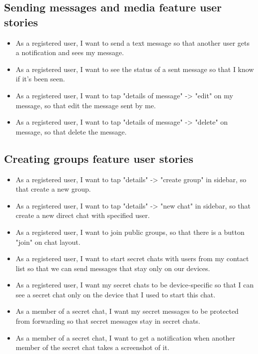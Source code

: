 \subsection{Sending messages and media feature user stories}\label{subsec:sending-messages-and-media-feature-user-stories}
\begin{itemize}
    \item As a registered user, I want to send a text message so that another user gets a notification and sees my message.
    \item As a registered user, I want to see the status of a sent message so that I know if it’s been seen.
    \item As a registered user, I want to tap "details of message" -> "edit" on my message, so that edit the message sent by me.
    \item As a registered user, I want to tap "details of message" -> "delete" on message, so that delete the message.
\end{itemize}

\subsection{Creating groups feature user stories}\label{subsec:creating-groups-feature-user-stories}
\begin{itemize}
    \item As a registered user, I want to tap "details" -> "create group" in sidebar, so that create a new group.
    \item As a registered user, I want to tap "details" -> "new chat" in sidebar, so that create a new direct chat with specified user.
    \item As a registered user, I want to join public groups, so that there is a button "join" on chat layout.
    \item As a registered user, I want to start secret chats with users from my contact list so that we can send messages that stay only on our devices.
    \item As a registered user, I want my secret chats to be device-specific so that I can see a secret chat only on the device that I used to start this chat.
    \item As a member of a secret chat, I want my secret messages to be protected from forwarding so that secret messages stay in secret chats.
    \item As a member of a secret chat, I want to get a notification when another member of the secret chat takes a screenshot of it.
\end{itemize}

